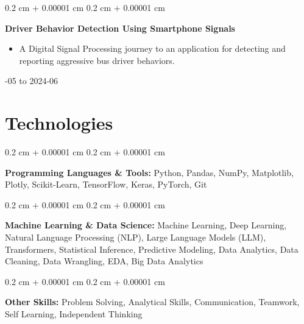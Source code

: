 \documentclass[10pt, letterpaper]{article}
\newenvironment{highlights}{
    \begin{itemize}[
        topsep=0.10 cm,
        parsep=0.10 cm,
        partopsep=0pt,
        itemsep=0pt,
        leftmargin=0.4 cm + 10pt
    ]
}{
    \end{itemize}
} %
\newenvironment{onecolentry}{
    \begin{adjustwidth}{
        0.2 cm + 0.00001 cm
    }{
        0.2 cm + 0.00001 cm
    }
}{
    \end{adjustwidth}
} %
\newenvironment{twocolentry}[2][]{
    \onecolentry
    \def\secondColumn{#2}
    \setcolumnwidth{\fill, 4.5 cm}
    \begin{paracol}{2}
}{
    \switchcolumn \raggedleft \secondColumn
    \end{paracol}
    \endonecolentry
} %
\begin{document}
        \vspace{0.2 cm}

        \begin{twocolentry}{
            2024-05 to 2024-06
        }
            \textbf{Driver Behavior Detection Using Smartphone Signals}
            \begin{highlights}
                \item A Digital Signal Processing journey to an application for detecting and reporting aggressive bus driver behaviors.
            \end{highlights}
        \end{twocolentry}



    
    \section{Technologies}



        
        \begin{onecolentry}
            \textbf{Programming Languages \& Tools:} Python, Pandas, NumPy, Matplotlib, Plotly, Scikit-Learn, TensorFlow, Keras, PyTorch, Git
        \end{onecolentry}

        \vspace{0.2 cm}

        \begin{onecolentry}
            \textbf{Machine Learning \& Data Science:} Machine Learning, Deep Learning, Natural Language Processing (NLP), Large Language Models (LLM), Transformers, Statistical Inference, Predictive Modeling, Data Analytics, Data Cleaning, Data Wrangling, EDA, Big Data Analytics
        \end{onecolentry}

        \vspace{0.2 cm}

        \begin{onecolentry}
            \textbf{Other Skills:} Problem Solving, Analytical Skills, Communication, Teamwork, Self Learning, Independent Thinking
        \end{onecolentry}


    
\end{document}
